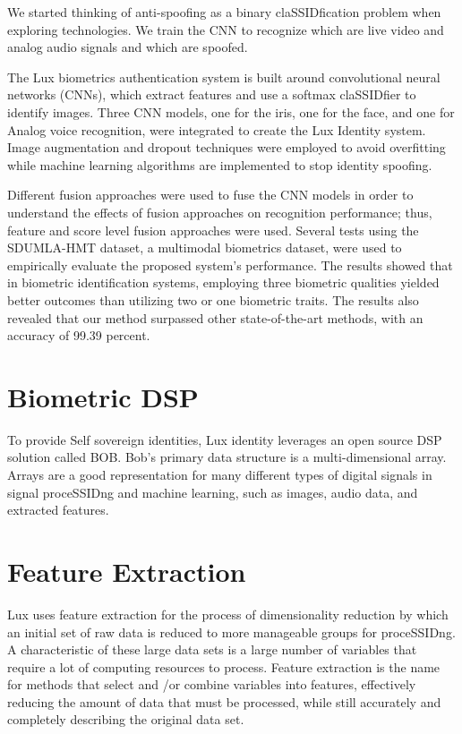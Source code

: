 \documentclass[11pt]{article}
\begin{document}
We started thinking of anti-spoofing as a binary claSSIDfication problem when exploring technologies. We train the CNN to recognize which are live video and analog audio signals and which are spoofed.


The Lux biometrics authentication system is built around convolutional neural networks (CNNs), which extract features and use a softmax claSSIDfier to identify images. Three CNN models, one for the iris, one for the face, and one for Analog voice recognition, were integrated to create the Lux Identity system. Image augmentation and dropout techniques were employed to avoid overfitting while machine learning algorithms are implemented to stop identity spoofing.


Different fusion approaches were used to fuse the CNN models in order to understand the effects of fusion approaches on recognition performance; thus, feature and score level fusion approaches were used. Several tests using the SDUMLA-HMT dataset, a multimodal biometrics dataset, were used to empirically evaluate the proposed system's performance. The results showed that in biometric identification systems, employing three biometric qualities yielded better outcomes than utilizing two or one biometric traits. The results also revealed that our method surpassed other state-of-the-art methods, with an accuracy of 99.39 percent.


\section{Biometric DSP}

To provide Self sovereign identities, Lux identity leverages an open source DSP solution called BOB. Bob's primary data structure is a multi-dimensional array. Arrays are a good representation for many different types of digital signals in signal proceSSIDng and machine learning, such as images, audio data, and extracted features.


\section{Feature Extraction}

Lux uses feature extraction for the process of dimensionality reduction by which an initial set of raw data is reduced to more manageable groups for proceSSIDng. A characteristic of these large data sets is a large number of variables that require a lot of computing resources to process. Feature extraction is the name for methods that select and /or combine variables into features, effectively reducing the amount of data that must be processed, while still accurately and completely describing the original data set.
\end{document}
